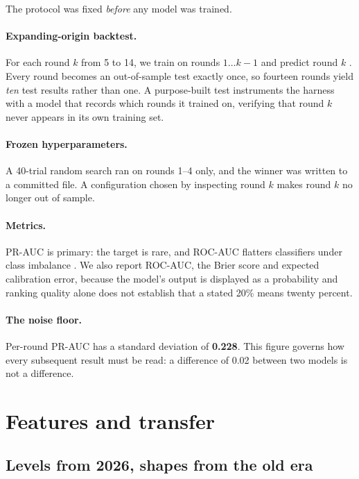 \documentclass[11pt,a4paper]{article}
\newcommand{\prauc}{PR\nobreakdash-AUC}
\newcommand{\rocauc}{ROC\nobreakdash-AUC}
\begin{document}
The protocol was fixed \emph{before} any model was trained.

\paragraph{Expanding-origin backtest.} For each round $k$ from 5 to
14, we train on rounds $1\ldots k{-}1$ and predict round $k$
\citep{hyndman2021forecasting}. Every round becomes an out-of-sample test exactly
once, so fourteen rounds yield \emph{ten} test results rather than one. A
purpose-built test instruments the harness with a model that records which rounds
it trained on, verifying that round $k$ never appears in its own training set.

\paragraph{Frozen hyperparameters.} A 40-trial random search
\citep{bergstra2012random} ran on rounds 1--4 only, and the winner was
written to a committed file. A configuration chosen by inspecting round $k$ makes
round $k$ no longer out of sample.

\paragraph{Metrics.} \prauc{} is primary: the target is rare, and \rocauc{}
flatters classifiers under class imbalance \citep{davis2006relationship}. We also
report \rocauc{}, the Brier score \citep{brier1950verification} and expected
calibration error, because the model's output is displayed as a probability and
ranking quality alone does not establish that a stated 20\% means
twenty percent.

\paragraph{The noise floor.} Per-round \prauc{} has a standard deviation of
\textbf{0.228}. This figure governs how every subsequent result must be
read: a difference of 0.02 between two models is not a difference.

\section{Features and transfer}
\label{sec:transfer}

\subsection{Levels from 2026, shapes from the old era}
\end{document}
